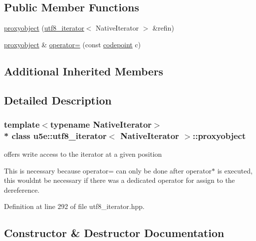 \subsection*{Public Member Functions}
\begin{DoxyCompactItemize}
\item 
\hyperlink{classu5e_1_1utf8__iterator_1_1proxyobject_a81e1a4e72b44fb59be44669304dcf741}{proxyobject} (\hyperlink{classu5e_1_1utf8__iterator}{utf8\+\_\+iterator}$<$ Native\+Iterator $>$ \&refin)
\item 
\hyperlink{classu5e_1_1utf8__iterator_1_1proxyobject}{proxyobject} \& \hyperlink{classu5e_1_1utf8__iterator_1_1proxyobject_a7e78eebdd29c280b3b39da10a259a8f3}{operator=} (const \hyperlink{classu5e_1_1codepoint}{codepoint} c)
\end{DoxyCompactItemize}
\subsection*{Additional Inherited Members}


\subsection{Detailed Description}
\subsubsection*{template$<$typename Native\+Iterator$>$\\*
class u5e\+::utf8\+\_\+iterator$<$ Native\+Iterator $>$\+::proxyobject}

offers write access to the iterator at a given position 

This is necessary because operator= can only be done after operator$\ast$ is executed, this wouldn\textquotesingle{}t be necessary if there was a dedicated operator for \textquotesingle{}assign to the dereference\textquotesingle{}. 

Definition at line 292 of file utf8\+\_\+iterator.\+hpp.



\subsection{Constructor \& Destructor Documentation}
